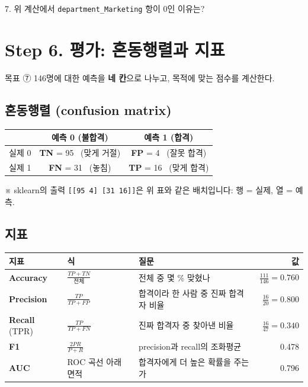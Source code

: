 \documentclass[11pt,a4paper]{article}
\newcommand{\term}[1]{\textbf{#1}}
\newcommand{\code}[1]{\texttt{#1}}
\newcommand{\aside}[1]{{\footnotesize\color{black!65}#1}}
\begin{document}
\begin{qbox}
7. 위 계산에서 \code{department\_Marketing} 항이 0인 이유는?
\end{qbox}

\section{Step 6. 평가: 혼동행렬과 지표}
\begin{goalbox}{목표 \quad ⑦}
146명에 대한 예측을 \textbf{네 칸}으로 나누고, 목적에 맞는 점수를 계산한다.
\end{goalbox}

\subsection{혼동행렬 (confusion matrix)}
\begin{center}
\begin{tabular}{@{}l c c@{}}
\toprule
 & 예측 0 (불합격) & 예측 1 (합격) \\
\midrule
실제 0 & \textbf{TN} = 95 \ (맞게 거절) & \textbf{FP} = 4 \ (잘못 합격) \\
실제 1 & \textbf{FN} = 31 \ (놓침) & \textbf{TP} = 16 \ (맞게 합격) \\
\bottomrule
\end{tabular}
\end{center}
\aside{※ sklearn의 출력 \code{[[95 4] [31 16]]}은 위 표와 같은 배치입니다: 행 = 실제, 열 = 예측.}

\subsection{지표}
\begin{center}\small
\begin{tabular}{@{}l l l r@{}}
\toprule
지표 & 식 & 질문 & 값 \\
\midrule
\term{Accuracy} & $\frac{TP+TN}{\text{전체}}$ & 전체 중 몇 \% 맞혔나 & $\frac{111}{146}=0.760$ \\
\term{Precision} & $\frac{TP}{TP+FP}$ & 합격이라 한 사람 중 진짜 합격자 비율 & $\frac{16}{20}=0.800$ \\
\term{Recall} (TPR) & $\frac{TP}{TP+FN}$ & 진짜 합격자 중 찾아낸 비율 & $\frac{16}{47}=0.340$ \\
\term{F1} & $\frac{2PR}{P+R}$ & precision과 recall의 조화평균 & 0.478 \\
\term{AUC} & ROC 곡선 아래 면적 & 합격자에게 더 높은 확률을 주는가 & 0.796 \\
\bottomrule
\end{tabular}
\end{center}
\end{document}
